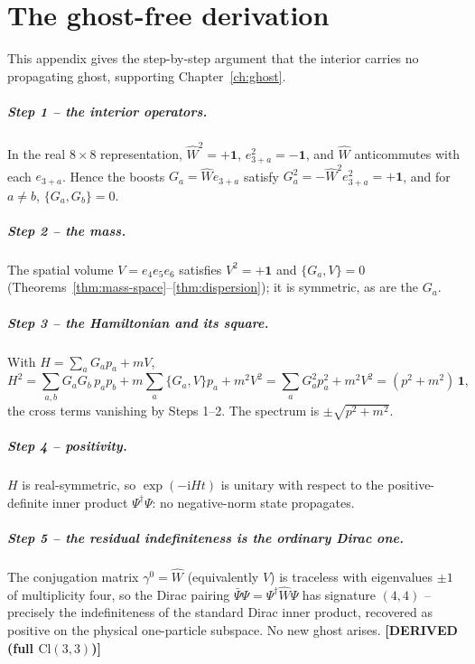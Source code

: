 \documentclass[11pt,oneside]{book}
\newcommand{\Wh}{\hat{W}}                         %
\newcommand{\Cl}{\mathrm{Cl}}                     %
\newcommand{\status}[1]{{\sffamily\bfseries\color{statuscol}[#1]}}
\theoremstyle{plain}
\theoremstyle{definition}
\theoremstyle{remark}
\begin{document}
\chapter{The ghost-free derivation}
\label{app:ghost}

This appendix gives the step-by-step argument that the interior carries no
propagating ghost, supporting Chapter~\ref{ch:ghost}.

\paragraph{Step 1 -- the interior operators.}
In the real $8\times8$ representation, $\Wh^2=+\mathbf 1$, $e_{3+a}^2=-\mathbf 1$, and
$\Wh$ anticommutes with each $e_{3+a}$. Hence the boosts $G_a=\Wh e_{3+a}$ satisfy
$G_a^2=-\Wh^2e_{3+a}^2=+\mathbf 1$, and for $a\neq b$,
$\{G_a,G_b\}=0$.

\paragraph{Step 2 -- the mass.}
The spatial volume $V=e_4e_5e_6$ satisfies $V^2=+\mathbf 1$ and $\{G_a,V\}=0$
(Theorems~\ref{thm:mass-space}--\ref{thm:dispersion}); it is symmetric, as are the
$G_a$.

\paragraph{Step 3 -- the Hamiltonian and its square.}
With $H=\sum_a G_a p_a+mV$,
\[
  H^2=\sum_{a,b}G_aG_b\,p_ap_b+m\sum_a\{G_a,V\}p_a+m^2V^2
     =\sum_a G_a^2 p_a^2+m^2V^2=(p^2+m^2)\,\mathbf 1,
\]
the cross terms vanishing by Steps 1--2. The spectrum is $\pm\sqrt{p^2+m^2}$.

\paragraph{Step 4 -- positivity.}
$H$ is real-symmetric, so $\exp(-\mathrm i Ht)$ is unitary with respect to the
positive-definite inner product $\Psi^\dagger\Psi$: no negative-norm state
propagates.

\paragraph{Step 5 -- the residual indefiniteness is the ordinary Dirac one.}
The conjugation matrix $\gamma^0=\Wh$ (equivalently $V$) is traceless with
eigenvalues $\pm1$ of multiplicity four, so the Dirac pairing
$\bar\Psi\Psi=\Psi^\dagger\Wh\Psi$ has signature $(4,4)$ -- precisely the
indefiniteness of the standard Dirac inner product, recovered as positive on the
physical one-particle subspace. No new ghost arises. \status{DERIVED (full $\Cl(3,3)$)}
\end{document}
